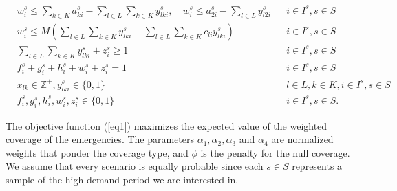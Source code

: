 \begin{align}
   &  w_i^s \leq  \sum_{k\in K}a_{ki}^s - \sum_{l \in L} \sum_{k \in K} y_{lki}^s, \quad  w_i^s \leq   a_{2i}^s - \sum_{l \in L}   y_{l2i}^s &&  i \in I^s,  s\in S
    \label{eq11}\\
   & w_i^s \leq M \left( \sum_{l \in L} \sum_{k \in K} y_{lki}^s - \sum_{l \in L} \sum_{k \in K} c_{li} y_{lki}^s \right)  && i \in I^s,  s\in S 
    \label{eq12}\\
  & \sum_{l \in L} \sum_{k \in K} y_{lki}^s + z_i^s \geq 1 && i \in I^s,   s \in S  \label{eq13}\\
    & f_i^s + g_i^s + h_i^s + w_i^s + z_i^s = 1  && i \in I^s,  s \in S 
    \label{eq14}\\
  &  x_{lk} \in \mathbb{Z}^+ , y_{lki}^s \in \{ 0,1 \} && l \in L,   k \in K, i \in I^s, s \in S
    \label{eq15}\\
    & f_i^s, g_i^s, h_i^s, w_i^s, z_i^s \in \{ 0,1 \}  && i \in I^s,   s \in S.
    \label{eq16}
\end{align}

The objective function (\ref{eq1}) maximizes the expected value of the weighted coverage of the emergencies. %
The parameters $\alpha_1 , \alpha_2, \alpha_3$ and $\alpha_4$ are normalized weights that ponder the coverage type, and $\phi$ is the penalty for the null coverage. We assume that every scenario is equally probable since each $s\in S$ represents a sample of the high-demand period we are interested in.

